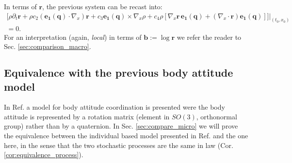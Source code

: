 \documentclass[12pt]{article}
\newcommand{\vezero}{\mathbf{e_{1}}}
\newcommand{\q}{\mathbf{q}}
\begin{document}
In terms of $\mathbf{r}$, the previous system can be recast into:
 \begin{eqnarray*}
\Big[\rho \partial_t \mathbf{r} + \rho  c_2 (\vezero(\q) \cdot \nabla_x) \mathbf{r} + c_3 \vezero(\q)\times\nabla_x \rho
+\left.c_4\rho  \left[ \nabla_{x}\mathbf{r} \, \vezero(\q) + (\nabla_{x}\cdot \mathbf{r})\vezero(\q) \right]\Big]\right|_{(t_0,x_0)}\\ =0.
\end{eqnarray*}
For an interpretation (again, \emph{local}) in terms of $\mathbf{b}:=\log \mathbf{r}$ we refer the reader to Sec. \ref{sec:comparison_macro}.


\subsection{Equivalence with the previous body attitude model}

In Ref. \cite{bodyattitude} a model for body attitude coordination is presented were the body attitude is represented by a rotation matrix (element in $SO(3)$, orthonormal group) rather than by a quaternion. In Sec. \ref{sec:compare_micro} we will prove the equivalence between the individual based model presented in Ref. \cite{bodyattitude} and the one here, in the sense that the two stochastic processes are the same in law (Cor. \ref{cor:equivalence_process}). 
\end{document}
